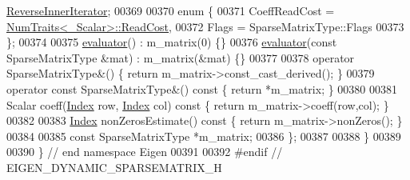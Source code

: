 \begin{DoxyCode}
      \hyperlink{class_eigen_1_1_dynamic_sparse_matrix_1_1_reverse_inner_iterator}{ReverseInnerIterator};
00369   
00370   \textcolor{keyword}{enum} \{
00371     CoeffReadCost = \hyperlink{group___core___module_struct_eigen_1_1_num_traits}{NumTraits<\_Scalar>::ReadCost},
00372     Flags = SparseMatrixType::Flags
00373   \};
00374   
00375   \hyperlink{struct_eigen_1_1internal_1_1evaluator}{evaluator}() : m\_matrix(0) \{\}
00376   \hyperlink{struct_eigen_1_1internal_1_1evaluator}{evaluator}(\textcolor{keyword}{const} SparseMatrixType &mat) : m\_matrix(&mat) \{\}
00377   
00378   \textcolor{keyword}{operator} SparseMatrixType&() \{ \textcolor{keywordflow}{return} m\_matrix->const\_cast\_derived(); \}
00379   \textcolor{keyword}{operator} \textcolor{keyword}{const} SparseMatrixType&() \textcolor{keyword}{const} \{ \textcolor{keywordflow}{return} *m\_matrix; \}
00380   
00381   Scalar coeff(\hyperlink{namespace_eigen_a62e77e0933482dafde8fe197d9a2cfde}{Index} row, \hyperlink{namespace_eigen_a62e77e0933482dafde8fe197d9a2cfde}{Index} col)\textcolor{keyword}{ const }\{ \textcolor{keywordflow}{return} m\_matrix->coeff(row,col); \}
00382   
00383   \hyperlink{namespace_eigen_a62e77e0933482dafde8fe197d9a2cfde}{Index} nonZerosEstimate()\textcolor{keyword}{ const }\{ \textcolor{keywordflow}{return} m\_matrix->nonZeros(); \}
00384 
00385   \textcolor{keyword}{const} SparseMatrixType *m\_matrix;
00386 \};
00387 
00388 \}
00389 
00390 \} \textcolor{comment}{// end namespace Eigen}
00391 
00392 \textcolor{preprocessor}{#endif // EIGEN\_DYNAMIC\_SPARSEMATRIX\_H}
\end{DoxyCode}
